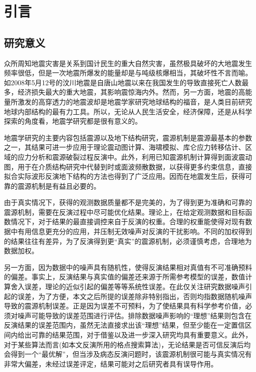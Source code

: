 \chapter{引言}

\section{研究意义}

众所周知地震灾害是关系到国计民生的重大自然灾害，虽然极具破坏的大地震发生频率很低，但是一次地震所爆发的能量却是与吨级核爆相当\citep{Stein2003}，其破坏性不言而喻。如2008年5月12号的汶川地震是自唐山地震以来在我国发生的导致直接死亡人数最多，经济损失最大的重大地震，其影响震惊海内外。然而，另一方面，地震的高能量所激发的高穿透力的地震波却是地震学家研究地球结构的福音，是人类目前研究地球内部结构的最有力工具。所以，无论从人民生活安全，经济保障，还是从科学探索的角度看，地震学研究都是很有意义的。

地震学研究的主要内容包括震源以及地下结构研究，震源机制是震源最基本的参数之一，其结果可进一步应用于理论震动图计算\citep{Wald2005}、海啸模拟\citep{Satake2007}、库仑应力转移估计\citep{King2007}、区域的应力分析和震源破裂过程反演中\citep{Kilb2001}。此外，利用已知震源机制计算得到面波震动图，用于在介质结构研究中代替到时或面波频散数据，以获得更多约束信息，直接拟合实际波形反演地下结构的方法也得到了广泛应用\citep{Nolet1990,Manaman2011,Friederich2003,Zielhuis1994,Cao2001,Lee1997}。因而在地震发生后，获得可靠的震源机制是有益且必要的。

由于真实情况下，获得的观测数据质量都不是完美的，为了得到更为准确和可靠的震源机制，需要在反演过程中尽可能优化结果。理论上，在给定观测数据和目标函数情况下，对于结果的最直接调控来自于反演的权重。合理的权重能使得对现有数据中有用信息更充分的应用，并压制无效噪声对反演的干扰影响。不同的加权得到的结果往往有差异，为了反演得到更“真实”的震源机制，必须谨慎考虑，合理地为数据加权。

另一方面，因为数据中的噪声具有随机性，使得反演结果相对真值有不可准确预料的偏差。事实上，反演结果与真实值的偏差还来源于所需参考模型的误差，数值计算舍入误差，理论的近似引起的偏差等等系统性误差。在此仅关注研究数据噪声引起的误差，为了方便，本文之后所提的误差除非特别指出，否则均指数据随机噪声导致的震源机制误差。正是因为误差不可预料，为了使结果具有科学参考价值，必须对噪声可能导致的误差范围进行评估。排除数据噪声影响的“理想”结果则包含在反演结果的误差范围内，虽然无法直接求出该“理想”结果，但至少能在一定置信区间内给出可靠的结果范围，对于借鉴以及进一步深入研究均具有重要意义。此外，对于某些算法而言(如本文反演所用的格点搜索算法)，无论结果是否可信反演后均会得到一个“最优解”，但当涉及病态反演问题时，该震源机制很可能与真实情况有非常大偏差，未经过误差评定，结果可能对之后研究者具有误导作用。

